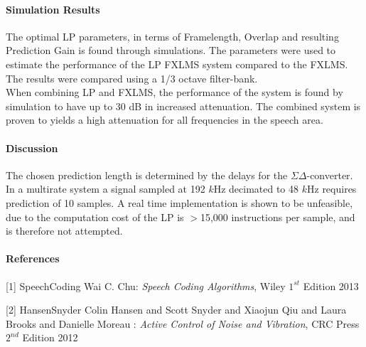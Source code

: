 \documentclass[a4paper]{article}
\begin{document}
	\paragraph{Simulation Results}
	The optimal LP parameters, in terms of Framelength, Overlap and resulting Prediction Gain is found through simulations. The parameters were used to estimate the performance of the LP FXLMS system compared to the FXLMS. The results were compared using a 1/3 octave filter-bank.\\
	When combining LP and FXLMS, the performance of the system is found by simulation to have up to 30 dB in increased attenuation. The combined system is proven to yields a high attenuation for all frequencies in the speech area.
	
	\paragraph{Discussion}
	The chosen prediction length is determined by the delays for the $\Sigma\Delta$-converter. In a multirate system a signal sampled at 192 $k$Hz decimated to 48 $k$Hz requires prediction of 10 samples.  
	A real time implementation is shown to be unfeasible, due to the computation cost of the LP is $>$15,000 instructions per sample, and is therefore not attempted.
	
	
	\paragraph{References}
	\begin{description}
		\item{[1]}		{SpeechCoding} Wai C. Chu: \emph{Speech Coding Algorithms}, Wiley $1^{st}$ Edition 2013
		\item{[2]}		{HansenSnyder} Colin Hansen and Scott Snyder and Xiaojun Qiu and Laura Brooks and Danielle Moreau  : \emph{Active Control of Noise and Vibration}, CRC Press $2^{nd}$ Edition 2012
	\end{description}
\end{document}
